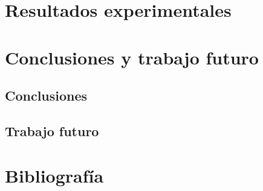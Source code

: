 \documentclass[onesided, 12pt]{scrbook}
\theoremstyle{break}
\begin{document}
\chapter{Resultados experimentales}
\label{capitulo:resultados experimentales}

\chapter{Conclusiones y trabajo futuro}
\label{capitulo:conclusiones}

\section{Conclusiones}
\label{seccion:conclusiones}

\section{Trabajo futuro}
\label{seccion:trabajo futuro}

\chapter{Bibliografía}
\end{document}
